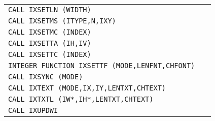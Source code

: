 \begin{longtable}{|>{\small\tt}p{.92\linewidth}r|}
CALL IXSETLN (WIDTH)                                  & \pageref{IXSETLN}\\
CALL IXSETMS (ITYPE,N,IXY)                            & \pageref{IXSETMS}\\
CALL IXSETMC (INDEX)                                  & \pageref{IXSETMC}\\
CALL IXSETTA (IH,IV)                                  & \pageref{IXSETTA}\\
CALL IXSETTC (INDEX)                                  & \pageref{IXSETTC}\\
INTEGER FUNCTION IXSETTF (MODE,LENFNT,CHFONT)         & \pageref{IXSETTF}\\
CALL IXSYNC (MODE)                                    & \pageref{IXSYNC} \\
CALL IXTEXT (MODE,IX,IY,LENTXT,CHTEXT)                & \pageref{IXTEXT} \\
CALL IXTXTL (IW*,IH*,LENTXT,CHTEXT)                   & \pageref{IXTXTL} \\
CALL IXUPDWI                                          & \pageref{IXUPDWI}\\
\hline
\end{longtable}
 

